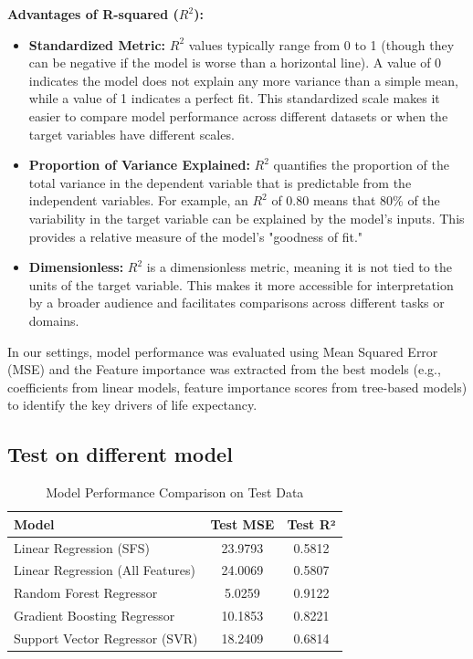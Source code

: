 \documentclass{article}
\begin{document}
\textbf{Advantages of R-squared ($R^2$):}
\begin{itemize}
    \item \textbf{Standardized Metric:} $R^2$ values typically range from 0 to 1 (though they can be negative if the model is worse than a horizontal line). A value of 0 indicates the model does not explain any more variance than a simple mean, while a value of 1 indicates a perfect fit. This standardized scale makes it easier to compare model performance across different datasets or when the target variables have different scales.
    \item \textbf{Proportion of Variance Explained:} $R^2$ quantifies the proportion of the total variance in the dependent variable that is predictable from the independent variables. For example, an $R^2$ of 0.80 means that 80\% of the variability in the target variable can be explained by the model's inputs. This provides a relative measure of the model's "goodness of fit."
    \item \textbf{Dimensionless:} $R^2$ is a dimensionless metric, meaning it is not tied to the units of the target variable. This makes it more accessible for interpretation by a broader audience and facilitates comparisons across different tasks or domains.
\end{itemize}


In our settings, model performance was evaluated using Mean Squared Error (MSE) and the Feature importance was
 extracted from the best models (e.g., coefficients from linear models, feature importance scores 
 from tree-based models) to identify the key drivers of life expectancy.

\subsection{Test on different model}

\begin{table}[h]
    \centering
    \caption{Model Performance Comparison on Test Data}
    \label{tab:model_performance}
    \begin{tabular}{|l|c|c|}
        \hline
        \textbf{Model} & \textbf{Test MSE} & \textbf{Test R²} \\
        \hline
        Linear Regression (SFS) & 23.9793 & 0.5812 \\
        Linear Regression (All Features) & 24.0069 & 0.5807 \\
        Random Forest Regressor & 5.0259 & 0.9122 \\
        Gradient Boosting Regressor & 10.1853 & 0.8221 \\
        Support Vector Regressor (SVR) & 18.2409 & 0.6814 \\
        \hline
    \end{tabular}
\end{table}
\end{document}
